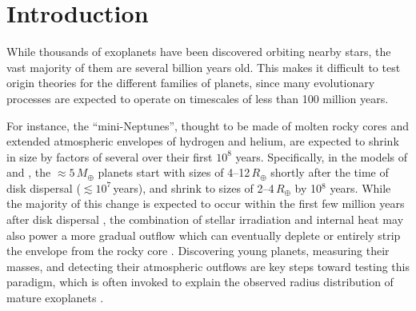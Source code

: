 \documentclass[12pt,modern,twocolumn,tighten]{aastex63}
\begin{document}
\begin{abstract}
\end{abstract}




\section{Introduction}

While thousands of exoplanets have been discovered orbiting nearby
stars, the vast majority of them are several billion years old.  This
makes it difficult to test origin theories for the different families
of planets, since many evolutionary processes are expected to operate
on timescales of less than 100 million years.

For instance, the ``mini-Neptunes'', thought to be made of molten
rocky cores \citep{kite_atmosphere_2020} and extended atmospheric
envelopes of hydrogen and helium, are expected to shrink in size by
factors of several over their first $10^8$ years.  Specifically, in
the models of \citet{owen_atmospheres_2016} and
\citet{owen_constraining_2020}, the $\approx5\,M_\oplus$ planets start
with sizes of 4--12\,$R_\oplus$ shortly after the time of disk
dispersal ($\lesssim$$10^7$\,years), and shrink to sizes of
2--4\,$R_\oplus$ by 10$^8$ years.  While the majority of this change
is expected to occur within the first few million years after disk
dispersal \citep{owen_atmospheres_2016}, the combination of stellar
irradiation and internal heat may also power a more gradual outflow
which can eventually deplete or entirely strip the envelope from the
rocky core \citep{Owen_Wu_2013,ginzburg_corepowered_2018}.
Discovering young planets, measuring their masses, and detecting their
atmospheric outflows are key steps toward testing this paradigm, which
is often invoked to explain the observed radius distribution of mature
exoplanets \citep{Fulton_et_al_2017}.
\end{document}
